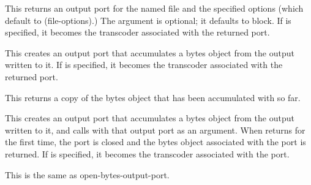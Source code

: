 \begin{entry}{%
}

This returns an output port for the named file and the specified
options (which default to {\cf (file-options)}.) The 
argument is optional; it defaults to {\cf block}.  If 
is specified, it becomes the transcoder associated with the returned
port.
\end{entry}   

\begin{entry}{%
}

This creates an output port that accumulates a bytes object from the
output written to it.  If  is specified, it becomes
the transcoder associated with the returned port.
\end{entry}

\begin{entry}{%
}

This returns a copy of the bytes object that has been accumulated with
 so far.
\end{entry}

\begin{entry}{%
}

 This
creates an output port that accumulates a bytes object from the output
written to it, and calls  with that output port as an
argument. When  returns for the first time, the port is
closed and the bytes object associated with the port is returned.  If
 is specified, it becomes the transcoder associated
with the port.
\end{entry}

\begin{entry}{%
}

This is the same as {\cf open-bytes-output-port}.
\end{entry}

